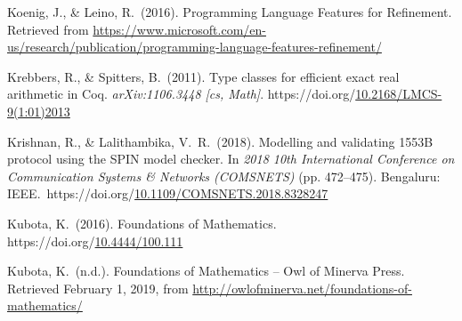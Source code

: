 \documentclass[12pt,twoside]{article}
\begin{document}
{\begin{thebibliography}{222}
Koenig, J., \& Leino, R.~(2016). Programming Language Features for Refinement. Retrieved from \href{https://www.microsoft.com/en-us/research/publication/programming-language-features-refinement/}{{\ttfamily https://\hspace{0pt}www.\hspace{0pt}microsoft.\hspace{0pt}com/\hspace{0pt}en-\hspace{0pt}us/\hspace{0pt}research/\hspace{0pt}publication/\hspace{0pt}programming-\hspace{0pt}language-\hspace{0pt}features-\hspace{0pt}refinement/\hspace{0pt}}}\label{koenig_programming_2016}%

Krebbers, R., \& Spitters, B.~(2011). Type classes for efficient exact real arithmetic in Coq. \emph{arXiv:1106.3448 {}[cs, Math]}. https://doi.org/\href{https://dx.doi.org/10.2168/LMCS-9\%25281:01\%25292013}{10.2168/LMCS-9(1:01)2013}\label{krebbers_type_2011}%

Krishnan, R., \& Lalithambika, V.~R.~(2018). Modelling and validating 1553B protocol using the SPIN model checker. In \emph{2018 10th International Conference on Communication Systems \& Networks (COMSNETS)} (pp. 472–475). Bengaluru: IEEE.~https://doi.org/\href{https://dx.doi.org/10.1109/COMSNETS.2018.8328247}{10.1109/COMSNETS.2018.8328247}\label{krishnan_modelling_2018}%

\mdbibitemlabel{[Kubota, 2016]}Kubota, K.~(2016). Foundations of Mathematics. https://doi.org/\href{https://dx.doi.org/10.4444/100.111}{10.4444/100.111}\label{kubota_foundations_2016}%

\mdbibitemlabel{[Kubota, n.d.]}Kubota, K.~(n.d.). Foundations of Mathematics – Owl of Minerva Press. Retrieved February 1, 2019, from \href{http://owlofminerva.net/foundations-of-mathematics/}{{\ttfamily http://\hspace{0pt}owlofminerva.\hspace{0pt}net/\hspace{0pt}foundations-\hspace{0pt}of-\hspace{0pt}mathematics/\hspace{0pt}}}\label{kubota_foundations_nodate}%


\end{thebibliography}}
\end{document}
